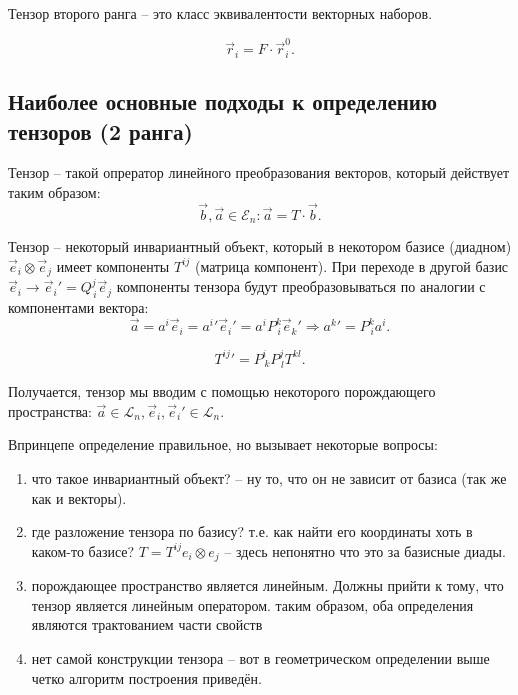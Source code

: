\begin{definition}
  Тензор второго ранга -- это класс эквивалентости векторных наборов.
\end{definition}

\[
  \vec{r}_i = F \cdot \vec{r}_i^0.
\]
\newline

\subsection{Наиболее основные подходы к определению тензоров (2 ранга)}

\begin{definition}
  Тензор -- такой опрератор линейного преобразования векторов, который действует таким образом:
  \[
    \vec{b}, \vec{a} \in \mathcal{E}_n : \vec{a} = T \cdot \vec{b}.
  \]
\end{definition}

\begin{definition}
  Тензор -- некоторый инвариантный объект, который в некотором базисе (диадном) $\vec{e}_i \otimes \vec{e}_j$ имеет компоненты $T^{ij}$ (матрица компонент).
  При переходе в другой базис $\vec{e}_i \to \vec{e}_i' = Q^j_{\, i} \vec{e}_j$ компоненты тензора
  будут преобразовываться по аналогии с компонентами вектора:
  \[
    \vec{a} = a^i \vec{e}_i = {a^i}' {\vec{e}_i}' = a^i P^k_{\,i} \vec{e}_k'
    \Rightarrow
    {a^k}' = P^k_{\, i} a^i.
  \]

  \[
    {T^{ij}}' = P^i_{\, k} P^j_{\, l} T^{kl}.
  \]

\end{definition}

Получается, тензор мы вводим с помощью некоторого порождающего пространства:
$\vec{a} \in \mathcal{L}_n, \vec{e}_i, \vec{e}_i' \in \mathcal{L}_n$.

Впринцепе определение правильное, но вызывает некоторые вопросы:
\begin{enumerate}
  \item что такое инвариантный объект? -- ну то, что он не зависит от базиса (так же как и векторы).

  \item где разложение тензора по базису? т.е. как найти его координаты хоть в каком-то базисе? 
    $T = T^{ij} e_i \otimes e_j$ -- здесь непонятно что это за базисные диады.

  \item порождающее пространство является линейным. Должны прийти к тому, что тензор является
    линейным оператором. таким образом, оба определения являются трактованием части свойств
    
    \begin{figure}[H]
    	\centering
    	
    \end{figure}

  \item нет самой конструкции тензора -- вот в геометрическом определении выше четко алгоритм 
    построения приведён.
\end{enumerate}

